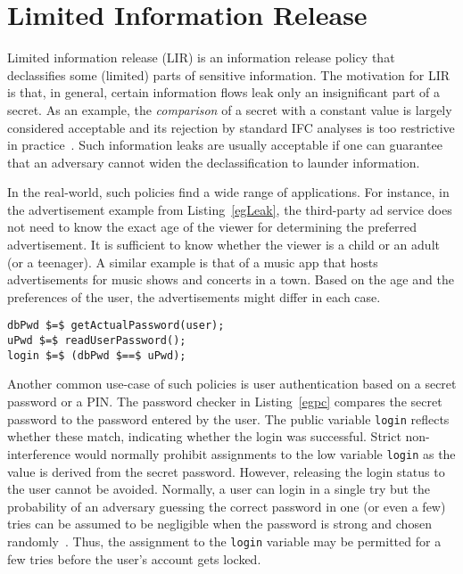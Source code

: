 \section{Limited Information Release}
\label{sec:lir-desc}
Limited information release (LIR) is an information release policy
that declassifies some (limited) parts of sensitive information. 
The motivation for LIR is that, in
general, certain information flows leak only an insignificant part of
a secret. As an example, the \emph{comparison} of a secret with a
constant value is largely considered acceptable and its rejection by
standard IFC analyses is too restrictive in
practice~. Such information leaks are usually
acceptable if one can guarantee that an adversary cannot widen the
declassification to launder information. 

In the real-world, such policies find a wide range of applications. For instance, 
in the advertisement example from Listing~\ref{egLeak}, the third-party 
ad service does not need to know the exact age of the viewer for determining 
the preferred advertisement. It is sufficient to know whether the viewer is 
a child or an adult (or a teenager). A similar example is that of a music 
app that hosts advertisements for music shows and concerts in a town. Based
on the age and the preferences of the user, the advertisements might differ 
in each case. 

\begin{lstlisting}[float,caption=Password Checker, label=egpc]
dbPwd $=$ getActualPassword(user);
uPwd $=$ readUserPassword();
login $=$ (dbPwd $==$ uPwd);
\end{lstlisting}

Another common use-case of such policies is user authentication 
based on a secret password or a PIN. The password checker in 
Listing~\ref{egpc} compares the secret password to 
the password entered by the user. The public variable \texttt{login}
reflects whether these match, indicating whether the login was
successful. Strict non-interference would normally prohibit 
assignments to the low variable \texttt{login} as the value is 
derived from the secret password. However, releasing the login 
status to the user cannot be avoided. Normally, a user can login 
in a single try but the probability of an adversary guessing the
correct password in one (or even a few) tries can be
assumed to be negligible when the password is strong and chosen 
randomly~. 
Thus, the assignment to the \texttt{login} variable may be permitted 
for a few tries before the user's account gets locked.


